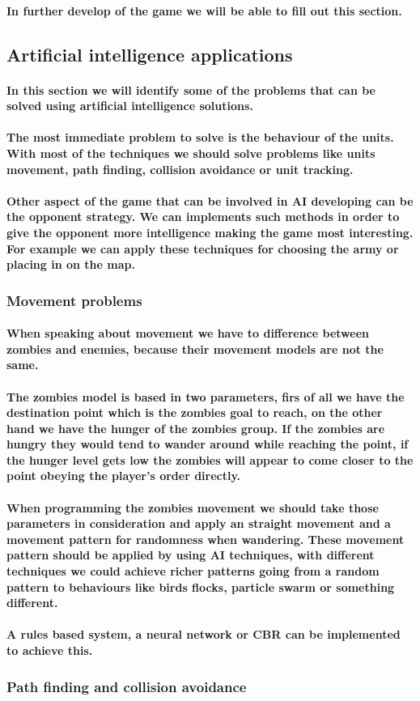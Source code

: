 \documentclass[a4paper,10pt]{article}
\newcommand{\p}[1]{\paragraph{\indent\textnormal{#1}}}
\begin{document}
    \p{In further develop of the game we will be able to fill out this section.}

  \subsection{Artificial intelligence applications}

  \p{In this section we will identify some of the problems that can be solved using artificial intelligence solutions.}

  \p{The most immediate problem to solve is the behaviour of the units. With most of the techniques we should solve problems like units movement, path finding, collision avoidance or unit tracking.}

  \p{Other aspect of the game that can be involved in AI developing can be the opponent strategy. We can implements such methods in order to give the opponent more intelligence making the game most interesting. For example we can apply these techniques for choosing the army or placing in on the map.}

  \subsubsection{Movement problems}
    
    \p{When speaking about movement we have to difference between zombies and enemies, because their movement models are not the same.}

    \p{The zombies model is based in two parameters, firs of all we have the destination point which is the zombies goal to reach, on the other hand we have the hunger of the zombies group. If the zombies are hungry they would tend to wander around while reaching the point, if the hunger level gets low the zombies will appear to come closer to the point obeying the player's order directly.}

    \p{When programming the zombies movement we should take those parameters in consideration and apply an straight movement and a movement pattern for randomness when wandering. These movement pattern should be applied by using AI techniques, with different techniques we could achieve richer patterns going from a random pattern to behaviours like birds flocks, particle swarm or something different.}

    \p{A rules based system, a neural network or CBR can be implemented to achieve this.}

   \subsubsection{Path finding and collision avoidance}
\end{document}
